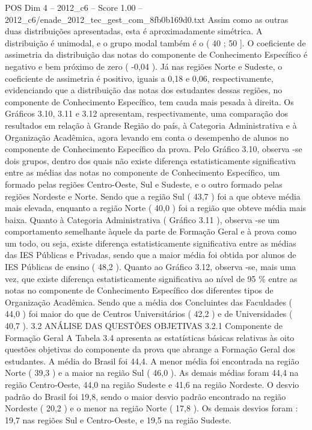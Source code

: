 \begin{textsample}{POS Dim 4 – 2012\_c6 – Score 1.00 – 2012\_c6/enade\_2012\_tec\_gest\_com\_8fb0b169d0.txt}
Assim como as outras duas distribuições apresentadas, esta é aproximadamente simétrica.
A distribuição é unimodal, e o grupo modal também é o ( 40 ; 50 ].
O coeficiente de assimetria da distribuição das notas do componente de Conhecimento Específico é negativo e bem próximo de zero ( -0,04 ).
Já nas regiões Norte e Sudeste, o coeficiente de assimetria é positivo, iguais a 0,18 e 0,06, respectivamente, evidenciando que a distribuição das notas dos estudantes dessas regiões, no componente de Conhecimento Específico, tem cauda mais pesada à direita.
Os Gráficos 3.10, 3.11 e 3.12 apresentam, respectivamente, uma comparação dos resultados em relação à Grande Região do país, à Categoria Administrativa e à Organização Acadêmica, agora levando em conta o desempenho de alunos no componente de Conhecimento Específico da prova.
Pelo Gráfico 3.10, observa -se dois grupos, dentro dos quais não existe diferença estatisticamente significativa entre as médias das notas no componente de Conhecimento Específico, um formado pelas regiões Centro-Oeste, Sul e Sudeste, e o outro formado pelas regiões Nordeste e Norte.
Sendo que a região Sul ( 43,7 ) foi a que obteve média mais elevada, enquanto a região Norte ( 40,0 ) foi a região que obteve média mais baixa.
Quanto à Categoria Administrativa ( Gráfico 3.11 ), observa -se um comportamento semelhante àquele da parte de Formação Geral e à prova como um todo, ou seja, existe diferença estatisticamente significativa entre as médias das IES Públicas e Privadas, sendo que a maior média foi obtida por alunos de IES Públicas de ensino ( 48,2 ).
Quanto ao Gráfico 3.12, observa -se, mais uma vez, que existe diferença estatisticamente significativa ao nível de 95 \% entre as notas no componente de Conhecimento Específico dos diferentes tipos de Organização Acadêmica.
Sendo que a média dos Concluintes das Faculdades ( 44,0 ) foi maior do que de Centros Universitários ( 42,2 ) e de Universidades ( 40,7 ). 3.2 ANÁLISE DAS QUESTÕES OBJETIVAS 3.2.1 Componente de Formação Geral A Tabela 3.4 apresenta as estatísticas básicas relativas às oito questões objetivas do componente da prova que abrange a Formação Geral dos estudantes.
A média do Brasil foi 44,4.
A menor média foi encontrada na região Norte ( 39,3 ) e a maior na região Sul ( 46,0 ).
As demais médias foram 44,4 na região Centro-Oeste, 44,0 na região Sudeste e 41,6 na região Nordeste.
O desvio padrão do Brasil foi 19,8, sendo o maior desvio padrão encontrado na região Nordeste ( 20,2 ) e o menor na região Norte ( 17,8 ).
Os demais desvios foram : 19,7 nas regiões Sul e Centro-Oeste, e 19,5 na região Sudeste.

\end{textsample}
